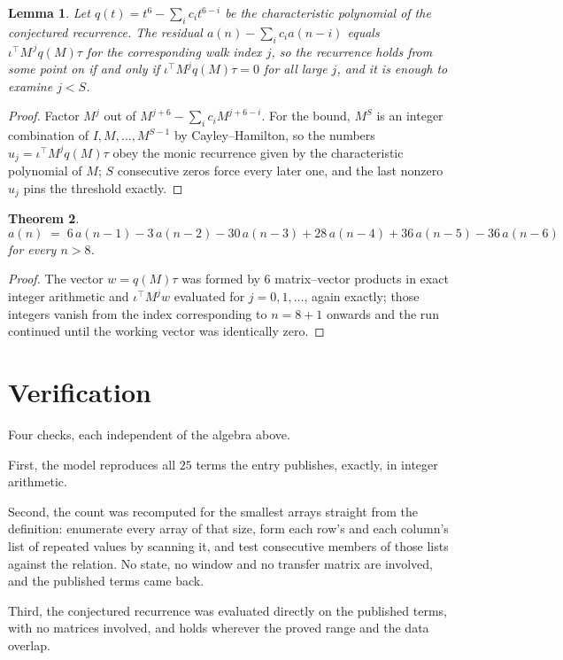 \documentclass[11pt,a4paper]{article}
\theoremstyle{plain}
\newtheorem{theorem}{Theorem}
\newtheorem{lemma}[theorem]{Lemma}
\theoremstyle{definition}
\begin{document}
\begin{lemma}\label{lem:crit}
Let $q(t)=t^{6}-\sum_i c_it^{6-i}$ be the characteristic polynomial of the
conjectured recurrence. The residual $a(n)-\sum_ic_ia(n-i)$ equals
$\iota^{\!\top}M^{\,j}q(M)\tau$ for the corresponding walk index $j$, so the recurrence
holds from some point on if and only if $\iota^{\!\top}M^{j}q(M)\tau=0$ for all large $j$,
and it is enough to examine $j<S$.
\end{lemma}

\begin{proof}
Factor $M^{j}$ out of $M^{j+6}-\sum_ic_iM^{j+6-i}$. For the bound, $M^{S}$
is an integer combination of $I,M,\dots,M^{S-1}$ by Cayley--Hamilton, so the numbers
$u_j=\iota^{\!\top}M^{j}q(M)\tau$ obey the monic recurrence given by the characteristic
polynomial of $M$; $S$ consecutive zeros force every later one, and the last nonzero $u_j$
pins the threshold exactly.
\end{proof}

\begin{theorem}
\[
a(n)\;=\;6\,a(n-1) - 3\,a(n-2) - 30\,a(n-3) + 28\,a(n-4) + 36\,a(n-5) - 36\,a(n-6)
\]
for every $n>8$.
\end{theorem}

\begin{proof}
The vector $w=q(M)\tau$ was formed by $6$ matrix--vector products in exact integer
arithmetic and $\iota^{\!\top}M^{j}w$ evaluated for $j=0,1,\dots$, again exactly; those
integers vanish from the index corresponding to $n=8+1$ onwards and the run continued
until the working vector was identically zero.
\end{proof}

\section{Verification}

Four checks, each independent of the algebra above.

First, the model reproduces all $25$ terms the entry publishes, exactly, in integer
arithmetic.

Second, the count was recomputed for the smallest arrays straight from the definition:
enumerate every array of that size, form each row's and each column's list of repeated values
by scanning it, and test consecutive members of those lists against the relation. No state, no
window and no transfer matrix are involved, and the published terms came back.

Third, the conjectured recurrence was evaluated directly on the published terms, with no
matrices involved, and holds wherever the proved range and the data overlap.
\end{document}
